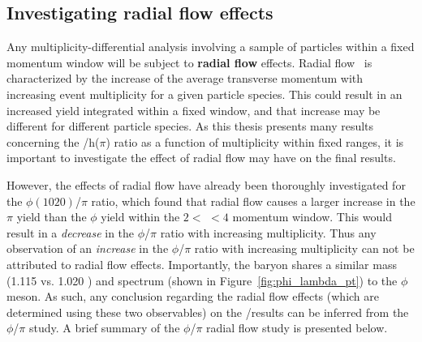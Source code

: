 \clearpage

\subsection{Investigating radial flow effects}

Any multiplicity-differential analysis involving a sample of particles within a fixed \pt momentum window will be subject to \textbf{radial flow} effects. Radial flow~\cite{RadialFlow} is characterized by the increase of the average transverse momentum \meanpt with increasing event multiplicity for a given particle species. This could result in an increased yield integrated within a fixed \pt window, and that increase may be different for different particle species. As this thesis presents many results concerning the \lmb/h($\pi$) ratio as a function of multiplicity within fixed \pt ranges, it is important to investigate the effect of radial flow may have on the final results.

However, the effects of radial flow have already been thoroughly investigated for the $\phi(1020)$/$\pi$ ratio, which found that radial flow causes a larger increase in the $\pi$ yield than the $\phi$ yield within the $2 <$ \pt $< 4$ \GeVc momentum window. This would result in a \textit{decrease} in the $\phi$/$\pi$ ratio with increasing multiplicity. Thus any observation of an \textit{increase} in the $\phi$/$\pi$ ratio with increasing multiplicity can not be attributed to radial flow effects. Importantly, the \lmb baryon shares a similar mass (1.115 vs. 1.020 \GeVmass) and \pt spectrum (shown in Figure~\ref{fig:phi_lambda_pt}) to the $\phi$ meson. As such, any conclusion regarding the radial flow effects (which are determined using these two observables) on the \lmb/\pi results can be inferred from the $\phi$/$\pi$ study. A brief summary of the $\phi$/$\pi$ radial flow study is presented below.

